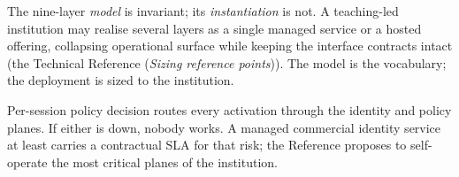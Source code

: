 \documentclass[11pt,a4paper,twoside]{book}
\newcommand{\trref}[1]{the Technical Reference (\emph{#1})}
\begin{document}
\begin{clarificationbox}
The nine-layer \emph{model} is invariant; its \emph{instantiation} is not.
A teaching-led institution may realise several layers as a single managed
service or a hosted offering, collapsing operational surface while keeping
the interface contracts intact (\trref{Sizing reference points}). The model
is the vocabulary; the deployment is sized to the institution.
\end{clarificationbox}

\begin{questionbox}
Per-session policy decision routes every activation through the
identity and policy planes. If either is down, nobody works. A
managed commercial identity service at least carries a contractual
SLA for that risk; the Reference proposes to self-operate the most
critical planes of the institution.
\end{questionbox}
\end{document}
